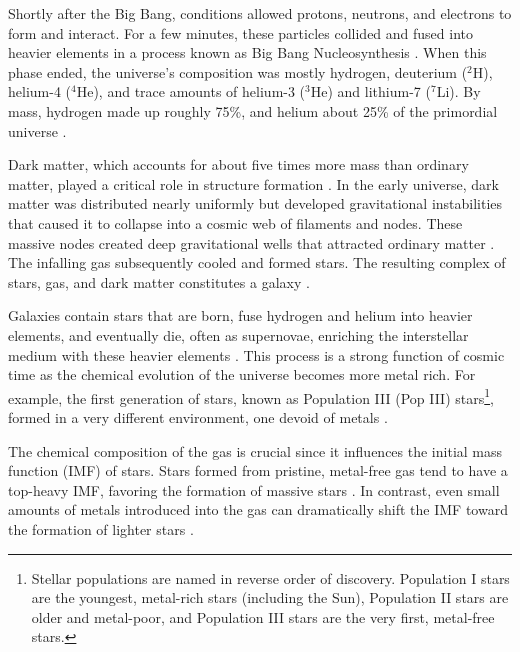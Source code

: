     Shortly after the Big Bang, conditions allowed protons, neutrons, and electrons to form and interact. For a few minutes, these particles collided and fused into heavier elements in a process known as Big Bang Nucleosynthesis \citep{2007ARNPS..57..463S}. When this phase ended, the universe's composition was mostly hydrogen, deuterium ($^2$H), helium-4 ($^4$He), and trace amounts of helium-3 ($^3$He) and lithium-7 ($^7$Li). By mass, hydrogen made up roughly 75\%, and helium about 25\% of the primordial universe \citep{1966ApJ...146..542P,2016RvMP...88a5004C}.

    Dark matter, which accounts for about five times more mass than ordinary matter, played a critical role in structure formation \citep{2020A&A...641A...6P}. In the early universe, dark matter was distributed nearly uniformly but developed gravitational instabilities that caused it to collapse into a cosmic web of filaments and nodes. These massive nodes created deep gravitational wells that attracted ordinary matter \citep{1974ApJ...187..425P}. The infalling gas subsequently cooled and formed stars. The resulting complex of stars, gas, and dark matter constitutes a galaxy \citep{2008LNP...740.....P,2010gfe..book.....M}.

    Galaxies contain stars that are born, fuse hydrogen and helium into heavier elements, and eventually die, often as supernovae, enriching the interstellar medium with these heavier elements \citep{2019A&ARv..27....3M}. This process is a strong function of cosmic time as the chemical evolution of the universe becomes more metal rich. For example, the first generation of stars, known as Population III (Pop III) stars\footnote{Stellar populations are named in reverse order of discovery. Population I stars are the youngest, metal-rich stars (including the Sun), Population II stars are older and metal-poor, and Population III stars are the very first, metal-free stars.}, formed in a very different environment, one devoid of metals \citep{2002Sci...295...93A,2005SSRv..117..445G,2013RPPh...76k2901B}. 

    The chemical composition of the gas is crucial since it influences the initial mass function (IMF) of stars. Stars formed from pristine, metal-free gas tend to have a top-heavy IMF, favoring the formation of massive stars \citep{2002ApJ...571...30S,2006MNRAS.369..825S}. In contrast, even small amounts of metals introduced into the gas can dramatically shift the IMF toward the formation of lighter stars \citep{2021MNRAS.508.4175C}.

